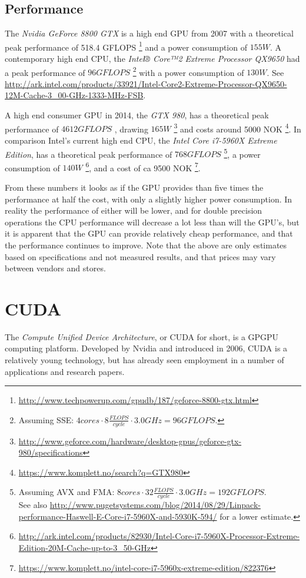 \subsection{Performance}
The \emph{Nvidia GeForce 8800 GTX} is a high end GPU from 2007 with a theoretical peak performance of 518.4 GFLOPS
\footnote{\url{http://www.techpowerup.com/gpudb/187/geforce-8800-gtx.html}} and a power consumption of $155W$.
A contemporary high end CPU, the \emph{Intel® Core™2 Extreme Processor QX9650} had a peak performance of $96GFLOPS$
\footnote{Assuming SSE: $4 cores \cdot 8 \frac{FLOPS}{cycle} \cdot 3.0GHz = 96GFLOPS$.} with a power consumption of
$130W$. See \url{http://ark.intel.com/products/33921/Intel-Core2-Extreme-Processor-QX9650-12M-Cache-3_00-GHz-1333-MHz-FSB}.

A high end consumer GPU in 2014, the \emph{GTX 980}, has a theoretical peak performance of $4612 GFLOPS$
\cite{maxwell},
drawing $165W$
\footnote{\url{http://www.geforce.com/hardware/desktop-gpus/geforce-gtx-980/specifications}}
and costs around 5000 NOK
\footnote{\url{https://www.komplett.no/search?q=GTX980}}.
In comparison Intel's current high end CPU, the \emph{Intel Core i7-5960X Extreme Edition}, has a theoretical peak performance of $768 GFLOPS$
\footnote{Assuming AVX and FMA: $8 cores \cdot 32 \frac{FLOPS}{cycle} \cdot 3.0GHz = 192GFLOPS$.\\See also
\url{http://www.pugetsystems.com/blog/2014/08/29/Linpack-performance-Haswell-E-Core-i7-5960X-and-5930K-594/} for a lower estimate.},
a power consumption of $140W$
\footnote{\url{http://ark.intel.com/products/82930/Intel-Core-i7-5960X-Processor-Extreme-Edition-20M-Cache-up-to-3_50-GHz}},
and a cost of ca 9500 NOK
\footnote{\url{https://www.komplett.no/intel-core-i7-5960x-extreme-edition/822376}}.

From these numbers it looks as if the GPU provides than five times the performance at half the cost, with only a
slightly higher power consumption. In reality the performance of either will be lower, and for double precision operations
the CPU performance will decrease a lot less than will the GPU's, but it is apparent that the GPU can provide relatively
cheap performance, and that the performance continues to improve. Note that the above are only estimates based on
specifications and not measured results, and that prices may vary between vendors and stores.

\section{CUDA}
The \emph{Compute Unified Device Architecture}, or CUDA for short, is a GPGPU computing platform. Developed by Nvidia
and introduced in 2006, CUDA is a relatively young technology, but has already seen employment in a number of applications
and research papers.

